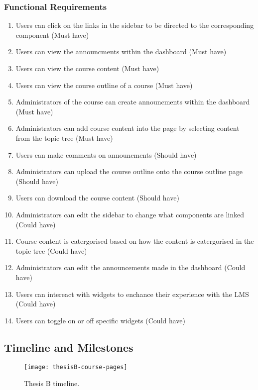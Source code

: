 \subsubsection{Functional Requirements}
\begin{enumerate}
    \item Users can click on the links in the sidebar to be directed to the corresponding component (Must have)
    \item Users can view the announcments within the dashboard (Must have)
    \item Users can view the course content (Must have)
    \item Users can view the course outline of a course (Must have)
    \item Administrators of the course can create announcments within the dashboard (Must have) 
    \item Administrators can add course content into the page by selecting content from the topic tree (Must have)
    \item Users can make comments on announcments (Should have)
    \item Administrators can upload the course outline onto the course outline page (Should have)
    \item Users can download the course content (Should have)
    \item Administrators can edit the sidebar to change what components are linked (Could have)
    \item Course content is catergorised based on how the content is catergorised in the topic tree (Could have)
    \item Administrators can edit the announcements made in the dashboard (Could have)
    \item Users can intereact with widgets to enchance their experience with the LMS (Could have)
    \item Users can toggle on or off specific widgets (Could have)
\end{enumerate}

\subsection{Timeline and Milestones}
\begin{figure}[h]
    \centering
    \texttt{[image: thesisB-course-pages]}
    \caption{Thesis B timeline.}
\end{figure}


